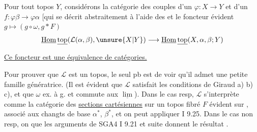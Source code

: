 \margin{$\big|$}
Pour tout topos $Y$, considérons la catégorie  des  couples  d'un   $\varphi:X\longrightarrow Y$ et d'un $f:\varphi\beta\longrightarrow\varphi\alpha$ [qui se décrit abstraitement à l'aide des
et le foncteur évident $g\longmapsto(g\circ\omega,g*F)$
\[
\underline{\operatorname{Hom}}\,\underline{\mathrm{top}}(\mathcal L(\alpha,\beta),\unsure{X|Y})\longrightarrow\underline{\operatorname{Hom}}\,\underline{\mathrm{top}}(X,\alpha,\beta;Y)
\]


\uline{Ce foncteur est une équivalence de catégories.}

Pour prouver que $\mathcal L$ est un topos, le seul pb est de voir qu'il admet une petite famille génératrice. (Il est évident que $\mathcal L$ satisfait les conditions de Giraud a) b) c), et que $\omega$  ex. à g. et commute aux $\underline{\lim}$). Dans le cas resp, $\mathcal L$ s'interprète comme la catégorie des \uline{sections cartésiennes} sur un topos fibré $F$ évident sur
,
 associé aux changts de base $\alpha^*$, $\beta^*$, et on peut appliquer  I 9.25. Dans le cas non resp, on 
 que les arguments de SGA4 I 9.21 et suite donnent le résultat .

